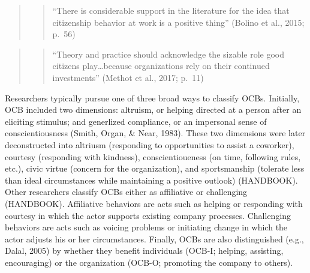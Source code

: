 \documentclass[english,,man]{apa6}
\theoremstyle{definition}
\theoremstyle{definition}
\theoremstyle{definition}
\theoremstyle{remark}
\begin{document}
\begin{quote}
\begin{quote}
\enquote{There is considerable support in the literature for the idea
that citizenship behavior at work is a positive thing} (Bolino et al.,
2015; p.~56)
\end{quote}
\end{quote}

\begin{quote}
\begin{quote}
\enquote{Theory and practice should acknowledge the sizable role good
citizens play\ldots{}because organizations rely on their continued
investments} (Methot et al., 2017; p.~11)
\end{quote}
\end{quote}

Researchers typically pursue one of three broad ways to classify OCBs.
Initially, OCB included two dimensions: altruism, or helping directed at
a person after an eliciting stimulus; and generlized compliance, or an
impersonal sense of conscientiousness (Smith, Organ, \& Near, 1983).
These two dimensions were later deconstructed into altriusm (responding
to opportunities to assist a coworker), courtesy (responding with
kindness), conscientioueness (on time, following rules, etc.), civic
virtue (concern for the organization), and sportsmanship (tolerate less
than ideal circumstances while maintaining a positive outlook)
(HANDBOOK). Other researchers classify OCBs either as affiliative or
challenging (HANDBOOK). Affiliative behaviors are acts such as helping
or responding with courtesy in which the actor supports existing company
processes. Challenging behaviors are acts such as voicing problems or
initiating change in which the actor adjusts his or her circumstances.
Finally, OCBs are also distinguished (e.g., Dalal, 2005) by whether they
benefit individuals (OCB-I; helping, assisting, encouraging) or the
organization (OCB-O; promoting the company to others).
\end{document}
